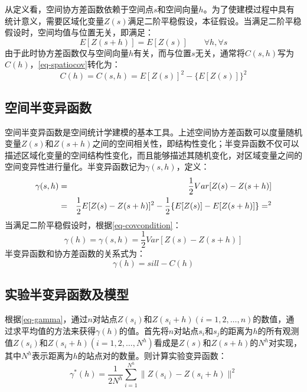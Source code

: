 从定义看，空间协方差函数依赖于空间点$s$和空间向量$h$。为了使建模过程中具有统计意义，需要区域化变量$Z(s)$满足二阶平稳假设，本征假设。当满足二阶平稳假设时，空间均值与位置无关，即满足：
\begin{equation}
    E[Z(s+h)] = E[Z(s)] \qquad \forall h,\forall s
    \label{eq-covcondition}
\end{equation}
由于此时协方差函数仅与空间向量$h$有关，而与位置$s$无关，通常将$C(s,h)$写为$C(h)$，\cref{eq-spatiocov}转化为：
\begin{equation}
    C(h)=C(s,h) = E[Z(s)]^2 - \{ E[Z(s)] \}^2
    \label{eq-conditionalcov}
\end{equation}

\subsection{空间半变异函数}
空间半变异函数是空间统计学建模的基本工具。上述\textcolor[rgb]{1,0,0}{空间协方差函数可以度量随机变量$Z(s)$和$Z(s+h)$之间的空间相关性，即结构性变化}；半变异函数不仅可以描述区域化变量的空间结构性变化，而且能够描述其随机变化，对区域变量之间的空间变异性进行量化。半变异函数记为$\gamma(s,h)$，定义：
\begin{eqnarray}
    \gamma(s,h) &=&\dfrac{1}{2}Var[Z(s)-Z(s+h)] \notag \\
    &=& \dfrac{1}{2}E[Z(s)-Z(s+h)]^2 - \dfrac{1}{2}\{ E[Z(s)] - E[Z(s+h)] \}=^2 
    \label{eq-gammapre}
\end{eqnarray}
当满足二阶平稳假设时，根据\cref{eq-covcondition}：
\begin{equation}
    \gamma(h) = \gamma(s,h) = \dfrac{1}{2}Var[Z(s) - Z(s+h)]
    \label{eq-gamma}
\end{equation}
半变异函数和协方差函数的关系式为：
\begin{equation}
    \gamma(h) = sill-C(h)
    \label{eq-gammacov}
\end{equation}

\subsection{实验半变异函数及模型}

根据\cref{eq-gamma}，通过$n$对站点$Z(s_i)$和$Z(s_i+h)(i=1,2,\dots,n)$的数值，通过求平均值的方法来获得$\gamma(h)$的值。首先将$n$对站点$s_i$和$s_j$的距离为$h$的所有观测值$Z(s_i)$和$Z(s_i+h)(i=1,2,\dots,N^h)$看成是$Z(s)$和$Z(s+h)$的$N^h$对实现，其中$N^h$表示距离为$h$的站点对的数量。则计算实验变异函数：
\begin{equation}
    \gamma^*(h) = \dfrac{1}{2N^h}\sum\limits_{i=1}^{N^h}\| Z(s_i)-Z(s_i+h) \|^2
    \label{eq-realisticgamma}
\end{equation}

